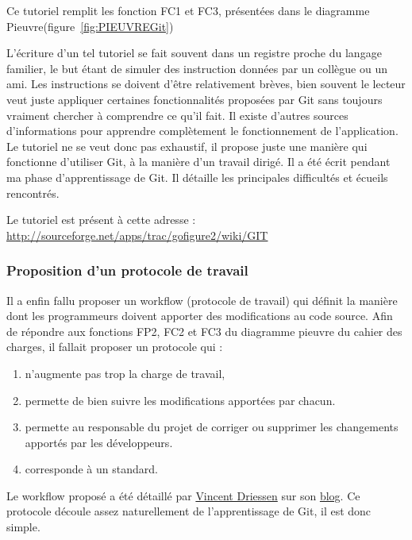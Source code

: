 Ce tutoriel remplit les fonction FC1 et FC3, présentées dans le diagramme Pieuvre(figure~\ref{fig:PIEUVREGit})

L'écriture d'un tel tutoriel se fait souvent dans un registre proche du langage familier,
le but étant de simuler des instruction données par un collègue ou un ami. 
Les instructions se doivent d'être relativement brèves, bien souvent le lecteur veut juste appliquer certaines fonctionnalités 
proposées par Git sans toujours vraiment chercher à comprendre ce qu'il fait. 
Il existe d'autres sources d'informations pour apprendre complètement le fonctionnement de l'application.
Le tutoriel ne se veut donc pas exhaustif, il propose juste une manière qui fonctionne d'utiliser Git,
à la manière d'un travail dirigé. Il a été écrit pendant ma phase d'apprentissage de Git. 
Il détaille les principales difficultés et écueils rencontrés. 

Le tutoriel est présent à cette adresse : \\
\url{http://sourceforge.net/apps/trac/gofigure2/wiki/GIT}

\subsubsection{Proposition d'un protocole de travail}
Il a enfin fallu proposer un workflow (protocole de travail) 
qui définit la manière dont les programmeurs
doivent apporter des modifications au code source.
Afin de répondre aux fonctions FP2, FC2 et FC3 du diagramme pieuvre du cahier des charges, il fallait proposer un protocole qui :
\begin{enumerate}
  \item n'augmente pas trop la charge de travail,
  \item permette de bien suivre les modifications apportées par chacun. 
  \item permette au responsable du projet de corriger ou supprimer les changements apportés par les développeurs.
  \item corresponde à un standard.
\end{enumerate}

Le workflow proposé a été détaillé par \href{http://nvie.com/about }{Vincent Driessen} sur son \href{http://nvie.com/Git-model}{blog}.
Ce protocole découle assez naturellement de l'apprentissage de Git, il est donc simple.

